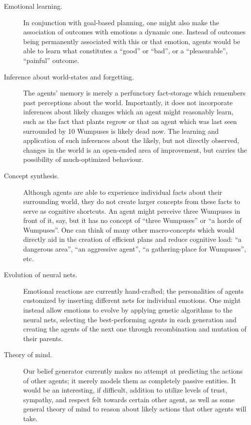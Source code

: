 \begin{description}
	 \item[Emotional learning.] In conjunction with goal-based planning, one might also make the association of outcomes with emotions a dynamic one. Instead of outcomes being permanently associated with this or that emotion, agents would be able to learn what constitutes a ``good'' or ``bad'', or a ``pleasurable'', ``painful'' outcome. 
	 
	 \item[Inference about world-states and forgetting.] The agents' memory is merely a perfunctory fact-storage which remembers past perceptions about the world. Importantly, it does not incorporate inferences about likely changes which an agent might reasonably learn, such as the fact that plants regrow or that an agent which was last seen surrounded by 10 Wumpuses is likely dead now. The learning and application of such inferences about the likely, but not directly observed, changes in the world is an open-ended area of improvement, but carries the possibility of much-optimized behaviour.
	 
	 \item[Concept synthesis.] Although agents are able to experience individual facts about their surrounding world, they do not create larger concepts from these facts to serve as cognitive shortcuts. An agent might perceive three Wumpuses in front of it, say, but it has no concept of ``three Wumpuses'' or ``a horde of Wumpuses''. One can think of many other macro-concepts which would directly aid in the creation of efficient plans and reduce cognitive load: ``a dangerous area'', ``an aggressive agent'', ``a gathering-place for Wumpuses'', etc.
	 
	 \item[Evolution of neural nets.] Emotional reactions are currently hand-crafted; the personalities of agents customized by inserting different nets for individual emotions. One might instead allow emotions to evolve by applying genetic algorithms to the neural nets, selecting the best-performing agents in each generation and creating the agents of the next one through recombination and mutation of their parents.
	 
	 \item[Theory of mind.] Our belief generator currently makes no attempt at predicting the actions of other agents; it merely models them as completely passive entities. It would be an interesting, if difficult, addition to utilize levels of trust, sympathy, and respect felt towards certain other agent, as well as some general theory of mind to reason about likely actions that other agents will take.
\end{description}

